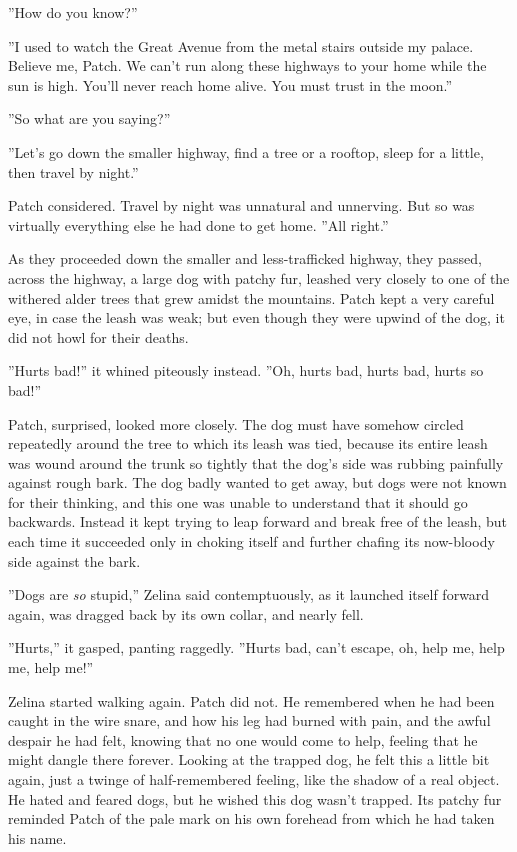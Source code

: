 \documentclass[12pt]{book}
\begin{document}
''How do you know?''

''I used to watch the Great Avenue from the metal stairs outside my
palace. Believe me, Patch. We can't run along these highways to your
home while the sun is high. You'll never reach home alive. You must
trust in the moon.''

''So what are you saying?''

''Let's go down the smaller highway, find a tree or a rooftop, sleep
for a little, then travel by night.''

Patch considered. Travel by night was unnatural and unnerving. But so
was virtually everything else he had done to get home. ''All right.''

As they proceeded down the smaller and less-trafficked highway, they
passed, across the highway, a large dog with patchy fur, leashed very
closely to one of the withered alder trees that grew amidst the
mountains. Patch kept a very careful eye, in case the leash was weak;
but even though they were upwind of the dog, it did not howl for their
deaths.

''Hurts bad!'' it whined piteously instead. ''Oh, hurts bad, hurts
bad, hurts so bad!''

Patch, surprised, looked more closely. The dog must have somehow
circled repeatedly around the tree to which its leash was tied,
because its entire leash was wound around the trunk so tightly that
the dog's side was rubbing painfully against rough bark. The dog badly
wanted to get away, but dogs were not known for their thinking, and
this one was unable to understand that it should go backwards. Instead
it kept trying to leap forward and break free of the leash, but each
time it succeeded only in choking itself and further chafing its
now-bloody side against the bark.

''Dogs are \textit{so} stupid,'' Zelina said contemptuously, as it
launched itself forward again, was dragged back by its own collar, and
nearly fell.

''Hurts,'' it gasped, panting raggedly. ''Hurts bad, can't escape, oh,
help me, help me, help me!''

Zelina started walking again. Patch did not. He remembered when he had
been caught in the wire snare, and how his leg had burned with pain,
and the awful despair he had felt, knowing that no one would come to
help, feeling that he might dangle there forever. Looking at the
trapped dog, he felt this a little bit again, just a twinge of
half-remembered feeling, like the shadow of a real object. He hated
and feared dogs, but he wished this dog wasn't trapped. Its patchy fur
reminded Patch of the pale mark on his own forehead from which he had
taken his name.
\end{document}
